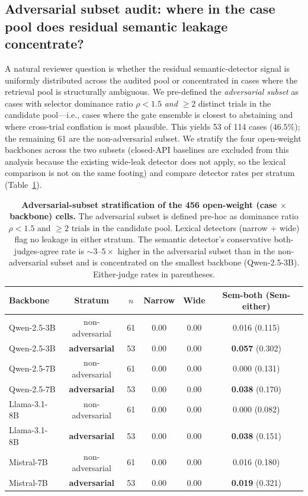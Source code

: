 \documentclass[11pt]{article}
\begin{document}
\subsection{Adversarial subset audit: where in the case pool does residual semantic leakage concentrate?}
\label{sec:results_adversarial}

A natural reviewer question is whether the residual semantic-detector signal is uniformly distributed across the audited pool or concentrated in cases where the retrieval pool is structurally ambiguous. We pre-defined the \emph{adversarial subset} as cases with selector dominance ratio $\rho < 1.5$ \emph{and} $\geq 2$ distinct trials in the candidate pool---i.e., cases where the gate ensemble is closest to abstaining and where cross-trial conflation is most plausible. This yields 53 of 114 cases ($46.5\%$); the remaining 61 are the non-adversarial subset. We stratify the four open-weight backbones across the two subsets (closed-API baselines are excluded from this analysis because the existing wide-leak detector does not apply, so the lexical comparison is not on the same footing) and compare detector rates per stratum (Table~\ref{tab:adv_subset}).

\begin{table}[!htbp]
\centering
\caption{\textbf{Adversarial-subset stratification of the 456 open-weight (case $\times$ backbone) cells.} The adversarial subset is defined pre-hoc as dominance ratio $\rho < 1.5$ and $\geq 2$ trials in the candidate pool. Lexical detectors (narrow + wide) flag no leakage in either stratum. The semantic detector's conservative both-judges-agree rate is $\sim 3$--$5\times$ higher in the adversarial subset than in the non-adversarial subset and is concentrated on the smallest backbone (Qwen-2.5-3B). Either-judge rates in parentheses.}
\label{tab:adv_subset}
\small
\setlength{\tabcolsep}{4pt}
\begin{tabular}{l c c c c c}
\toprule
Backbone & Stratum & $n$ & Narrow & Wide & Sem-both (Sem-either) \\
\midrule
Qwen-2.5-3B   & non-adversarial & 61 & 0.00 & 0.00 & 0.016 (0.115) \\
Qwen-2.5-3B   & \textbf{adversarial} & 53 & 0.00 & 0.00 & \textbf{0.057} (0.302) \\
\midrule
Qwen-2.5-7B   & non-adversarial & 61 & 0.00 & 0.00 & 0.000 (0.131) \\
Qwen-2.5-7B   & \textbf{adversarial} & 53 & 0.00 & 0.00 & \textbf{0.038} (0.170) \\
\midrule
Llama-3.1-8B  & non-adversarial & 61 & 0.00 & 0.00 & 0.000 (0.082) \\
Llama-3.1-8B  & \textbf{adversarial} & 53 & 0.00 & 0.00 & \textbf{0.038} (0.151) \\
\midrule
Mistral-7B    & non-adversarial & 61 & 0.00 & 0.00 & 0.016 (0.180) \\
Mistral-7B    & \textbf{adversarial} & 53 & 0.00 & 0.00 & \textbf{0.019} (0.321) \\
\bottomrule
\end{tabular}
\end{table}
\end{document}
